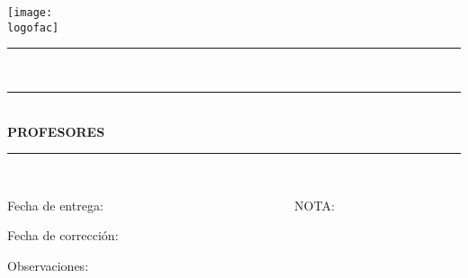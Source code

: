 
\begin{titlepage}
    \begin{center}
        \texttt{[image: \\logofac]}\\

        \vskip 0.25cm
        
        \textbf{\huge{\universidad}}
        
        \vskip 0.5cm
        
        \Large{\carrera}
        
        \vskip 0.3cm
        
        \LARGE{\materia}
        
        \rule{10cm}{0.01cm}\\
        \LARGE{\textbf{\unidad}}
        
        
        \Large{\titulo}
        
     \vspace{-0.3cm}
        \normalsize
        \rule{10cm}{0.01cm}\\
        \vspace{0.3cm}
        \autores
        \vskip 0.5cm
        \textbf{PROFESORES}\\
        \profesores
        \rule{10cm}{0.01cm}\\
        
        
\end{center}

    \vskip 1cm
    \noindent
    \hspace{30pt}Fecha de entrega:  ~~~~~~~~~~~~~~~~~~~~~~~~~~~~~ NOTA:
    
    \noindent
    \hspace{30pt}Fecha de corrección:
    
    \noindent
    \hspace{30pt}Observaciones: 

        
\end{titlepage}
